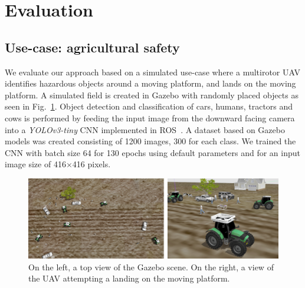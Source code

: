 \documentclass[conference]{IEEEtran}
\begin{document}
\section{Evaluation}
\label{sec:experimental}


\subsection{Use-case: agricultural safety}

We evaluate our approach based on a simulated use-case where a multirotor UAV identifies
hazardous objects around a moving platform, and lands on the
moving platform. A simulated field is created in Gazebo with randomly placed objects as seen in Fig.~\ref{fig:Gazebo}.
%
Object detection and classification of cars, humans, tractors and cows is performed by feeding the input
image from the downward facing camera into a \emph{YOLOv3-tiny} CNN\cite{yolov3} implemented in ROS~\cite{bjelonicYolo2018}. 
A dataset based on Gazebo models was created consisting of 1200 images, 300
for each class. We trained the CNN with batch size 64 for 130 epochs using default 
parameters and for an input image size of \SI{416}{}$\times$\SI{416}{}
pixels.

\begin{figure}[t]
\centering
\includegraphics[scale=0.2]{gazebo_scalled_gamma_corrected.png}
\caption{On the left, a top view of the Gazebo scene. 
On the right, a view of the UAV attempting a landing on the moving platform.}
\label{fig:Gazebo}
\end{figure}
\end{document}
